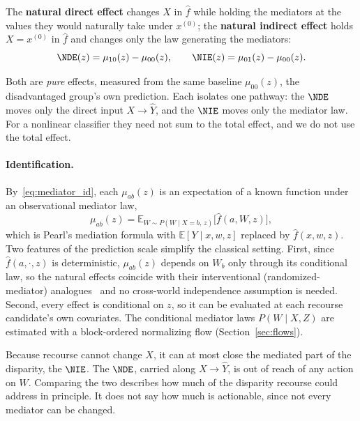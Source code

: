 \begin{definition}
\label{def:nde_nie}
The \textbf{natural direct effect} changes $X$ in $\hat f$ while holding the
mediators at the values they would naturally take under $x^{(0)}$; the
\textbf{natural indirect effect} holds $X=x^{(0)}$ in $\hat f$ and changes only
the law generating the mediators:
\begin{equation}
  \NDE(z)=\mu_{10}(z)-\mu_{00}(z),\qquad
  \NIE(z)=\mu_{01}(z)-\mu_{00}(z).
  \label{eq:effects}
\end{equation}
\end{definition}

\noindent Both are \emph{pure} effects, measured from the same baseline
$\mu_{00}(z)$, the disadvantaged group's own prediction. Each isolates one
pathway: the $\NDE$ moves only the direct input $X\to\hat Y$, and the $\NIE$
moves only the mediator law. For a nonlinear classifier they need not sum to
the total effect, and we do not use the total effect.

\paragraph{Identification.}
By~\eqref{eq:mediator_id}, each $\mu_{ab}(z)$ is an expectation of a known
function under an observational mediator law,
\begin{equation}
  \mu_{ab}(z)=\mathbb E_{W\sim P(W\mid X=b,\,z)}\bigl[\hat f(a,W,z)\bigr],
  \label{eq:mu_id}
\end{equation}
which is Pearl's mediation formula with $\mathbb E[Y\mid x,w,z]$ replaced by
$\hat f(x,w,z)$. Two features of the prediction scale simplify the classical
setting. First, since $\hat f(a,\cdot,z)$ is deterministic, $\mu_{ab}(z)$
depends on $W_b$ only through its conditional law, so the natural effects
coincide with their interventional (randomized-mediator)
analogues~\citep{didelez2006direct,vanderweele2014effect} and no cross-world
independence assumption is needed. Second, every effect is conditional on $z$,
so it can be evaluated at each recourse candidate's own covariates. The
conditional mediator laws $P(W\mid X,Z)$ are estimated with a block-ordered
normalizing flow (Section~\ref{sec:flows}).

\noindent Because recourse cannot change $X$, it can at most close the mediated
part of the disparity, the $\NIE$. The $\NDE$, carried along $X\to\hat Y$, is
out of reach of any action on $W$. Comparing the two describes how much of the
disparity recourse could address in principle. It does not say how much is
actionable, since not every mediator can be changed.


